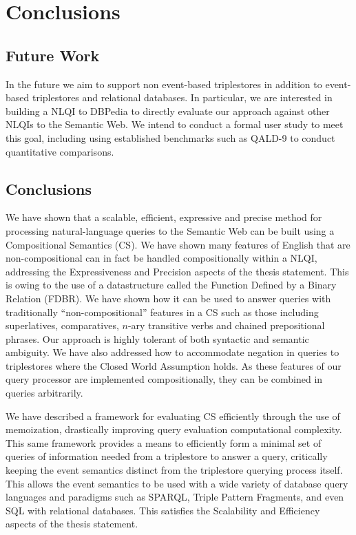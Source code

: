 \documentclass[../main.tex]{subfiles}
\begin{document}
\chapter{Conclusions}

\section{Future Work}

In the future we aim to support non event-based triplestores in addition
to event-based triplestores and relational databases. In particular,
we are interested in building a NLQI to DBPedia to directly evaluate
our approach against other NLQIs to the Semantic Web.  We intend to
conduct a formal user study to meet this goal, including using established
benchmarks such as QALD-9 \cite{qald9} to conduct quantitative comparisons.


\section{Conclusions}

We have shown that a scalable, efficient, expressive and precise method for processing natural-language queries to the Semantic Web can be built using a Compositional Semantics (CS).  We have shown many features of English that are non-compositional can in fact be handled compositionally within a NLQI, addressing the Expressiveness and Precision aspects of the thesis statement.  This is owing to the use of a datastructure called the Function Defined by a Binary Relation (FDBR).  We have shown how it can be used to answer queries with traditionally ``non-compositional'' features in a CS such as those including superlatives, comparatives, $n$-ary transitive verbs and chained prepositional phrases.  Our approach is highly tolerant of both syntactic and semantic ambiguity.  We have also addressed how to accommodate negation in queries to triplestores where the Closed World Assumption holds.  As these features of our query processor are implemented compositionally, they can be combined in queries arbitrarily.

We have described a framework for evaluating CS efficiently through the use of memoization, drastically improving query evaluation computational complexity.  This same framework provides a means to efficiently form a minimal set of queries of information needed from a triplestore to answer a query, critically keeping the event semantics distinct from the triplestore querying process itself.  This  allows the event semantics to be used with a wide variety of database query languages and paradigms such as SPARQL, Triple Pattern Fragments, and even SQL with relational databases.  This satisfies the Scalability and Efficiency aspects of the thesis statement.
\end{document}
